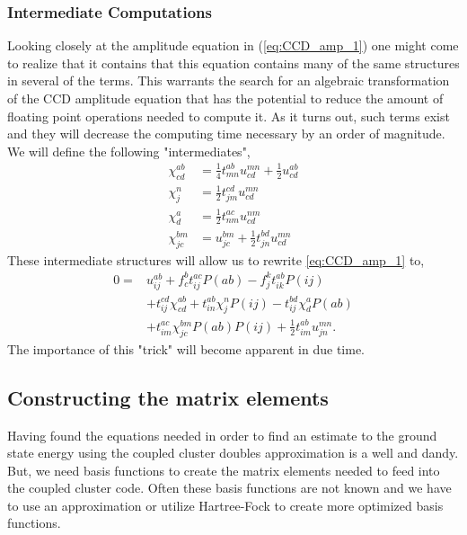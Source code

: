 \documentclass[
    a4paper, aps, twocolumn, floatfix, superscriptaddress,
    nofootinbib]{revtex4-1}
\newcommand{\1}{\mathds{1}}
\begin{document}
        \subsubsection{Intermediate Computations}
        Looking closely at the amplitude equation in (\ref{eq:CCD_amp_1}) one might come
        to realize that it contains that this equation contains many of the same structures in
        several of the terms. This warrants the search for an algebraic transformation of the
        CCD amplitude equation that has the potential to reduce the amount of floating point
        operations needed to compute it. As it turns out, such terms exist and they will decrease
        the computing time necessary by an order of magnitude. We will define the following
        "intermediates",
        \begin{align}
            \chi^{ab}_{cd} &= \frac{1}{4}t^{ab}_{mn} u^{mn}_{cd} + \frac{1}{2}u^{ab}_{cd} \\
            \chi^n_j &= \frac{1}{2}t^{cd}_{jm} u^{mn}_{cd} \\
            \chi^a_d &= \frac{1}{2} t^{ac}_{nm} u^{nm}_{cd} \\
            \chi^{bm}_{jc} &= u^{bm}_{jc} + \frac{1}{2}t^{bd}_{jn}u^{mn}_{cd}
        \end{align}
        These intermediate structures will allow us to rewrite \autoref{eq:CCD_amp_1} to,
        \begin{equation}
        \begin{aligned}
            0 =& u^{ab}_{ij} + f^b_c t^{ac}_{ij}P(ab) - f^k_jt^{ab}_{ik}P(ij) \\
              &+ t^{cd}_{ij}\chi^{ab}_{cd} + t^{ab}_{in}\chi^n_jP(ij)
               - t^{bd}_{ij}\chi^a_dP(ab) \\
              &+ t^{ac}_{im}\chi^{bm}_{jc}P(ab)P(ij) + \frac{1}{2}t^{ab}_{im}u^{mn}_{jn}.
        \end{aligned}
        \end{equation}
        The importance of this "trick" will become apparent in due time.

    \subsection{Constructing the matrix elements}
        Having found the equations needed in order to find an estimate to the
        ground state energy using the coupled cluster doubles approximation is a
        well and dandy. But, we need basis functions to create the matrix
        elements needed to feed into the coupled cluster code.  Often these
        basis functions are not known and we have to use an approximation or
        utilize Hartree-Fock to create more optimized basis functions.
\end{document}
